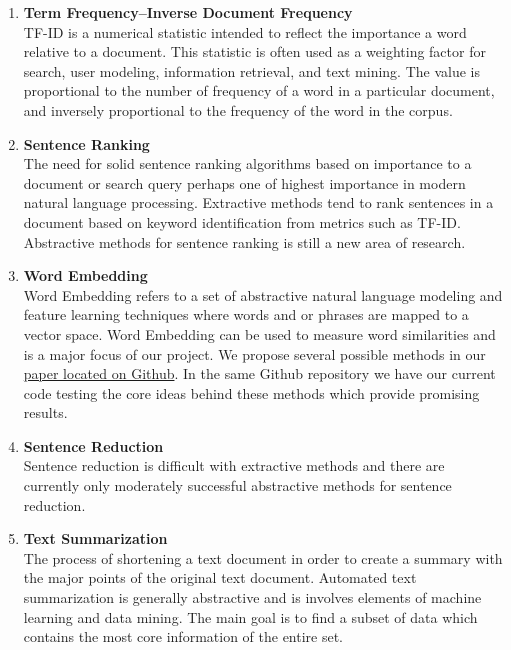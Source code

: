 \documentclass[12pt]{article}
\begin{document}
\begin{enumerate}
	\item 
		\textbf{Term Frequency–Inverse Document Frequency}\\
TF-ID is a numerical statistic intended to reflect the importance a word relative to a document. This statistic is often used as a weighting factor for search, user modeling, information retrieval, and text mining. The value is proportional to the number of frequency of a word in a particular document, and inversely proportional to the frequency of the word in the corpus.

	\item 
		\textbf{Sentence Ranking}\\
		The need for solid sentence ranking algorithms based on importance to a document or search query perhaps one of highest importance in modern natural language processing. Extractive methods tend to rank sentences in a document based on keyword identification from metrics such as TF-ID. Abstractive methods for sentence ranking is still a new area of research.

	\item 
		\textbf{Word Embedding}\\
		Word Embedding refers to a set of abstractive natural language modeling and feature learning techniques where words and or phrases are mapped to a vector space. Word Embedding can be used to measure word similarities and is a major focus of our project. We propose several possible methods in our \href{https://github.com/browlm13/Word-Embedding/blob/master/word_embedding_mock_1_v3.pdf}{paper located on Github}. In the same Github repository we have our current code testing the core ideas behind these methods which provide promising results.

	\item 
		\textbf{Sentence Reduction}\\
		Sentence reduction is difficult with extractive methods and there are currently only moderately successful abstractive methods for sentence reduction.
		
	\item 
		\textbf{Text Summarization}\\
The process of shortening a text document in order to create a summary with the major points of the original text document. Automated text summarization is generally abstractive and is involves elements of machine learning and data mining. The main goal is to find a subset of data which contains the most core information of the entire set. 

\end{enumerate}
\end{document}
